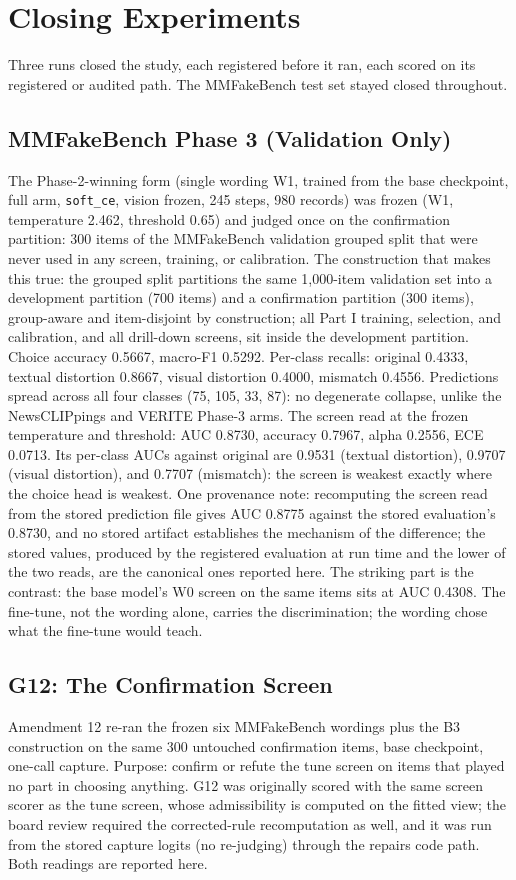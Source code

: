 \documentclass{article} %
\begin{document}
\section{Closing Experiments}
\label{sec:closing}
Three runs closed the study, each registered before it ran, each scored on its registered or audited path. The MMFakeBench test set stayed closed throughout.

\subsection{MMFakeBench Phase 3 (Validation Only)}
The Phase-2-winning form (single wording W1, trained from the base checkpoint, full arm, \texttt{soft\_ce}, vision frozen, 245 steps, 980 records) was frozen (W1, temperature 2.462, threshold 0.65) and judged once on the confirmation partition: 300 items of the MMFakeBench validation grouped split that were never used in any screen, training, or calibration. The construction that makes this true: the grouped split partitions the same 1,000-item validation set into a development partition (700 items) and a confirmation partition (300 items), group-aware and item-disjoint by construction; all Part I training, selection, and calibration, and all drill-down screens, sit inside the development partition. Choice accuracy 0.5667, macro-F1 0.5292. Per-class recalls: original 0.4333, textual distortion 0.8667, visual distortion 0.4000, mismatch 0.4556. Predictions spread across all four classes (75, 105, 33, 87): no degenerate collapse, unlike the NewsCLIPpings and VERITE Phase-3 arms. The screen read at the frozen temperature and threshold: AUC 0.8730, accuracy 0.7967, alpha 0.2556, ECE 0.0713. Its per-class AUCs against original are 0.9531 (textual distortion), 0.9707 (visual distortion), and 0.7707 (mismatch): the screen is weakest exactly where the choice head is weakest. One provenance note: recomputing the screen read from the stored prediction file gives AUC 0.8775 against the stored evaluation's 0.8730, and no stored artifact establishes the mechanism of the difference; the stored values, produced by the registered evaluation at run time and the lower of the two reads, are the canonical ones reported here. The striking part is the contrast: the base model's W0 screen on the same items sits at AUC 0.4308. The fine-tune, not the wording alone, carries the discrimination; the wording chose what the fine-tune would teach.

\subsection{G12: The Confirmation Screen}
Amendment 12 re-ran the frozen six MMFakeBench wordings plus the B3 construction on the same 300 untouched confirmation items, base checkpoint, one-call capture. Purpose: confirm or refute the tune screen on items that played no part in choosing anything. G12 was originally scored with the same screen scorer as the tune screen, whose admissibility is computed on the fitted view; the board review required the corrected-rule recomputation as well, and it was run from the stored capture logits (no re-judging) through the repairs code path. Both readings are reported here.
\end{document}
